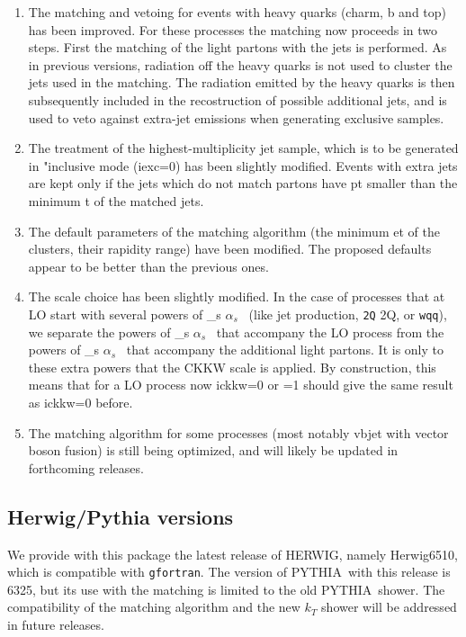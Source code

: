 \documentclass[paper]{JHEP3}
\def    \as             {\ifmmode \alpha_s \else $\alpha_s$ \fi}
\def\herwig{{\small HERWIG}}
\def\pythia{{\small PYTHIA}}
\begin{document}
\begin{appendix}
\begin{enumerate}
\item The matching and vetoing for events with heavy quarks (charm, b and
top) has been improved. For these processes the matching now proceeds
in two steps. First the matching of the light partons with the jets is
performed. As in previous versions, radiation off the heavy quarks is
not used to cluster the jets used in the matching. The radiation
emitted by the heavy quarks is then subsequently included in the
recostruction of possible additional jets, and is used to veto against
extra-jet emissions when generating exclusive samples. 
\item The treatment
of the highest-multiplicity jet sample, which is to be generated in
"inclusive mode (iexc=0) has been slightly modified. Events with extra
jets are kept only if the jets which do not match partons have pt
smaller than the minimum t of the matched jets.  
\item The default
parameters of the matching algorithm (the minimum et of the clusters,
their rapidity range) have been modified. The proposed defaults appear
to be better than the previous ones.  
\item The scale choice has been slightly modified.  In the case of
processes that at LO start with several powers of \as\ (like jet
production, {\tt 2Q} 2Q, or {\tt wqq}), we separate the
powers of \as\ that accompany the LO process from the powers of
\as\ that accompany the additional light partons. It is only to
these extra powers that the CKKW scale is applied. By construction,
this means that for a LO process now ickkw=0 or =1 should give the
same result as ickkw=0 before. 
\item The matching algorithm for some processes (most
notably vbjet with vector boson fusion) is still being optimized, and
will likely be updated in forthcoming releases.
\end{enumerate}

\subsection{Herwig/Pythia versions}
We provide with this package the latest release of \herwig,
namely Herwig6510, which is compatible with {\tt gfortran}.
The version of \pythia\ with this release is 6325, but its use with
the matching is limited to the old \pythia\ shower. The compatibility
of the matching algorithm and the new $k_T$ shower will be addressed
in future releases.


\end{appendix}
\end{document}
